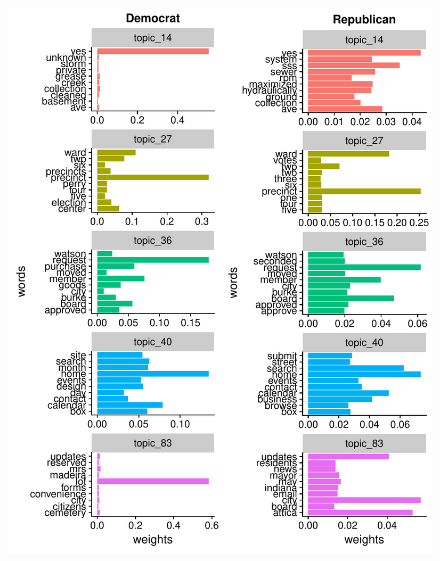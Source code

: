 \documentclass[11pt]{article}
\begin{document}
\begin{figure}[!ht]
	\centering
	\includegraphics[width=\linewidth]{figures/wtp_current_dem_rep.pdf}
\end{figure}


\end{document}
